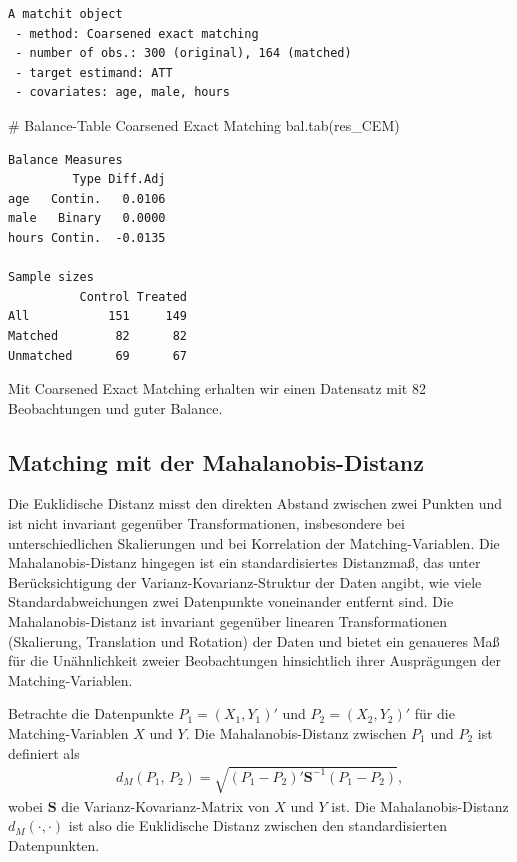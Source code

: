 \documentclass[
  a4paper,
  DIV=11,
  oneside]{scrreprt}
\newenvironment{Shaded}{\begin{snugshade}}{\end{snugshade}}
\newcommand{\CommentTok}[1]{\textcolor[rgb]{0.37,0.37,0.37}{#1}}
\newcommand{\FunctionTok}[1]{\textcolor[rgb]{0.28,0.35,0.67}{#1}}
\newcommand{\NormalTok}[1]{\textcolor[rgb]{0.00,0.23,0.31}{#1}}
\begin{document}
\begin{verbatim}
A matchit object
 - method: Coarsened exact matching
 - number of obs.: 300 (original), 164 (matched)
 - target estimand: ATT
 - covariates: age, male, hours
\end{verbatim}

\begin{Shaded}
\begin{Highlighting}[]
\CommentTok{\# Balance{-}Table Coarsened Exact Matching}
\FunctionTok{bal.tab}\NormalTok{(res\_CEM)}
\end{Highlighting}
\end{Shaded}

\begin{verbatim}
Balance Measures
         Type Diff.Adj
age   Contin.   0.0106
male   Binary   0.0000
hours Contin.  -0.0135

Sample sizes
          Control Treated
All           151     149
Matched        82      82
Unmatched      69      67
\end{verbatim}

Mit Coarsened Exact Matching erhalten wir einen Datensatz mit 82
Beobachtungen und guter Balance.

\hypertarget{matching-mit-der-mahalanobis-distanz}{%
\subsection{Matching mit der
Mahalanobis-Distanz}\label{matching-mit-der-mahalanobis-distanz}}

Die Euklidische Distanz misst den direkten Abstand zwischen zwei Punkten
und ist nicht invariant gegenüber Transformationen, insbesondere bei
unterschiedlichen Skalierungen und bei Korrelation der
Matching-Variablen. Die Mahalanobis-Distanz hingegen ist ein
standardisiertes Distanzmaß, das unter Berücksichtigung der
Varianz-Kovarianz-Struktur der Daten angibt, wie viele
Standardabweichungen zwei Datenpunkte voneinander entfernt sind. Die
Mahalanobis-Distanz ist invariant gegenüber linearen Transformationen
(Skalierung, Translation und Rotation) der Daten und bietet ein
genaueres Maß für die Unähnlichkeit zweier Beobachtungen hinsichtlich
ihrer Ausprägungen der Matching-Variablen.

Betrachte die Datenpunkte \(P_1=(X_1,Y_1)'\) und \(P_2=(X_2,Y_2)'\) für
die Matching-Variablen \(X\) und \(Y\). Die Mahalanobis-Distanz zwischen
\(P_1\) und \(P_2\) ist definiert als \begin{align*}
  d_M(P_1,\,P_2) = \sqrt{(P_1 - P_2)'\boldsymbol{S}^{-1} (P_1 - P_2)},
\end{align*} wobei \(\boldsymbol{S}\) die Varianz-Kovarianz-Matrix von
\(X\) und \(Y\) ist. Die Mahalanobis-Distanz \(d_M(\cdot,\cdot)\) ist
also die Euklidische Distanz zwischen den standardisierten Datenpunkten.
\end{document}
